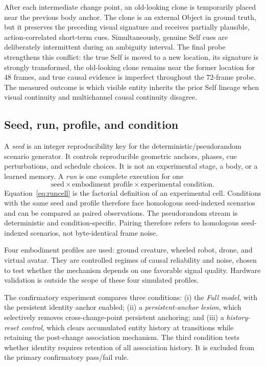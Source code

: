 \documentclass[journal]{IEEEtran}
\begin{document}
After each intermediate change point, an old-looking clone is temporarily placed near the previous body anchor. The clone is an external Object in ground truth, but it preserves the preceding visual signature and receives partially plausible, action-correlated short-term cues. Simultaneously, genuine Self cues are deliberately intermittent during an ambiguity interval. The final probe strengthens this conflict: the true Self is moved to a new location, its signature is strongly transformed, the old-looking clone remains near the former location for 48 frames, and true causal evidence is imperfect throughout the 72-frame probe. The measured outcome is which visible entity inherits the prior Self lineage when visual continuity and multichannel causal continuity disagree.

\subsection{Seed, run, profile, and condition}
A \emph{seed} is an integer reproducibility key for the deterministic/pseudorandom scenario generator. It controls reproducible geometric anchors, phases, cue perturbations, and schedule choices. It is not an experimental stage, a body, or a learned memory. A \emph{run} is one complete execution for one
\begin{equation}
\text{seed}\times\text{embodiment profile}\times\text{experimental condition}.
\label{eq:runcell}
\end{equation}
Equation~\eqref{eq:runcell} is the factorial definition of an experimental cell. Conditions with the same seed and profile therefore face homologous seed-indexed scenarios and can be compared as paired observations. The pseudorandom stream is deterministic and condition-specific. Pairing therefore refers to homologous seed-indexed scenarios, not byte-identical frame noise.

Four embodiment profiles are used: ground creature, wheeled robot, drone, and virtual avatar. They are controlled regimes of causal reliability and noise, chosen to test whether the mechanism depends on one favorable signal quality. Hardware validation is outside the scope of these four simulated profiles.

The confirmatory experiment compares three conditions: (i) the \emph{Full model}, with the persistent identity anchor enabled; (ii) a \emph{persistent-anchor lesion}, which selectively removes cross-change-point persistent anchoring; and (iii) a \emph{history-reset control}, which clears accumulated entity history at transitions while retaining the post-change association mechanism. The third condition tests whether identity requires retention of all association history. It is excluded from the primary confirmatory pass/fail rule.
\end{document}
